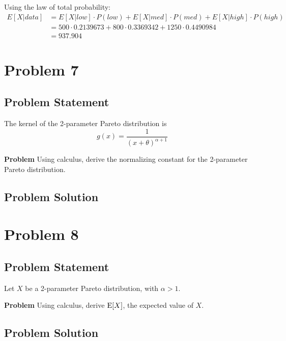 \documentclass[12pt]{article}
\theoremstyle{definition}
\begin{document}
Using the law of total probability:
\begin{align*}
E[X|data] &= E[X|low] \cdot P(low) + E[X|med] \cdot P(med) + E[X|high] \cdot P(high)\\
&= 500 \cdot 0.2139673 + 800 \cdot 0.3369342 + 1250 \cdot 0.4490984\\
&= 937.904
\end{align*}


\newpage
\section*{Problem 7}

\subsection*{Problem Statement}

The kernel of the 2-parameter Pareto distribution is
$$
g(x) = \frac{1}{(x + \theta)^{\alpha + 1}}
$$

\bigskip
\noindent
{\bf Problem} Using calculus, derive the normalizing constant for the 2-parameter Pareto distribution.


\subsection*{Problem Solution}




\newpage
\section*{Problem 8}

\subsection*{Problem Statement}

Let $X$ be a 2-parameter Pareto distribution, with $\alpha > 1$.

\bigskip
\noindent
{\bf Problem} Using calculus, derive $\hbox{E}[X]$, the expected value of $X$.


\subsection*{Problem Solution}
\end{document}
